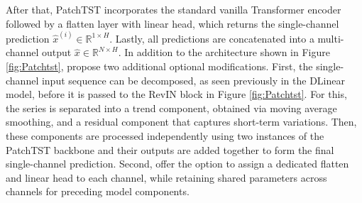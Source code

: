 \documentclass[a4paper,oneside,bibliography=totoc]{scrbook}
\begin{document}
After that, PatchTST incorporates the standard vanilla Transformer encoder \cite{vaswani_attention_2017} followed by a flatten layer with linear head, which returns the single-channel prediction $\hat{x}^{(i)} \in \mathbb{R}^{1\times H}$. 
Lastly, all predictions are concatenated into a multi-channel output $\hat{x} \in \mathbb{R}^{N\times H}$. 
In addition to the architecture shown in Figure \ref{fig:Patchtst}, \citet{nie_time_2022} propose two additional optional modifications.
First, the single-channel input sequence can be decomposed, as seen previously in the DLinear model, before it is passed to the RevIN block in Figure \ref{fig:Patchtst}.
For this, the series is separated into a trend component, obtained via moving average smoothing, and a residual component that captures short-term variations.
Then, these components are processed independently using two instances of the PatchTST backbone and their outputs are added together to form the final single-channel prediction.
Second, \citet{nie_time_2022} offer the option to assign a dedicated flatten and linear head to each channel, while retaining shared parameters across channels for preceding model components.
\end{document}
